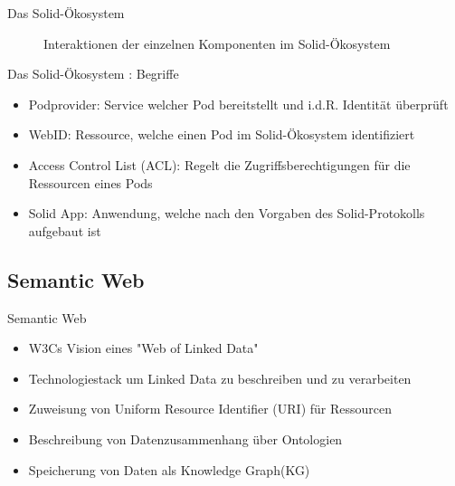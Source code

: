 \documentclass{beamer}              %
\begin{document}
\begin{frame}{Das Solid-Ökosystem}
\begin{figure}[htbp]
  
  \caption{Interaktionen der einzelnen Komponenten im Solid-Ökosystem}
\end{figure}

\end{frame}

\begin{frame}{Das Solid-Ökosystem : Begriffe}
\begin{itemize}
    \item Podprovider: Service welcher Pod bereitstellt und i.d.R. Identität überprüft\cite{sambra2016solid}
    \item WebID: Ressource, welche einen Pod im Solid-Ökosystem identifiziert
    \item Access Control List (ACL): Regelt die Zugriffsberechtigungen für die Ressourcen eines Pods
    \item Solid App: Anwendung, welche nach den Vorgaben des Solid-Protokolls aufgebaut ist
\end{itemize}
\end{frame}

\subsection{Semantic Web}
\begin{frame}{Semantic Web}
\begin{itemize}
    \item W3Cs Vision eines "Web of Linked Data"\cite{bernerslee1998semanticwebroadmap}
    \item Technologiestack um Linked Data zu beschreiben und zu verarbeiten
    \item Zuweisung von Uniform Resource Identifier (URI) für Ressourcen\cite{blumauer2006semantic}
    \item Beschreibung von Datenzusammenhang über Ontologien\cite{staab2009handbook}
    \item Speicherung von Daten als Knowledge Graph(KG)\cite{blumauer2006semantic}
\end{itemize}
\end{frame}
\end{document}
